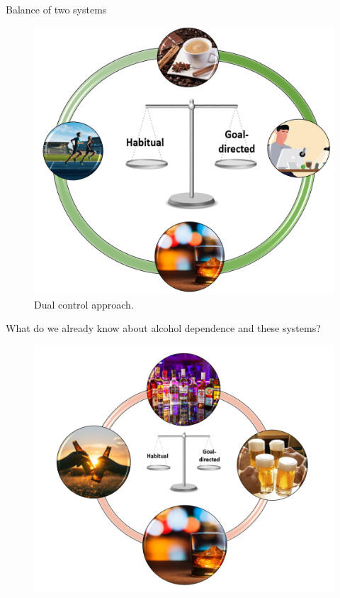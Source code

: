 \documentclass{bredelebeamer}
\begin{document}
\begin{frame}{Balance of two systems}

    \begin{figure}
        \centering
        \includegraphics[scale=0.32]{images/gZy.PNG}
        \caption{\small{Dual control approach.}}
    \end{figure}
\end{frame}
\begin{frame}{What do we already know about alcohol dependence and these systems?}
    \centering
     \begin{figure}
        \centering
        \includegraphics[scale=0.35]{images/Zyklus.PNG}
    \end{figure}
\end{frame}
\end{document}
